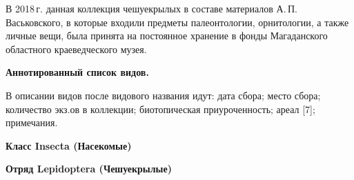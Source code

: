 В 2018\,г. данная коллекция чешуекрылых в составе материалов А.\,П.\,Вась\-ковского, в которые входили предметы палеонтологии, орнитологии, а также личные вещи, была принята на постоянное хранение в фонды Магаданского областного краеведческого музея.

\textbf{Аннотированный список видов.}

В описании видов после видового названия идут: дата сбора; место сбора; количество экз.ов в коллекции; биотопическая приуроченность; ареал [7]; примечания.
\vspace{-6pt}
\begin{center}
\textbf{Класс Insecta (Насекомые)}

\textbf{Отряд Lepidoptera (Чешуекрылые)}
\end{center}

\vspace{-8pt}
